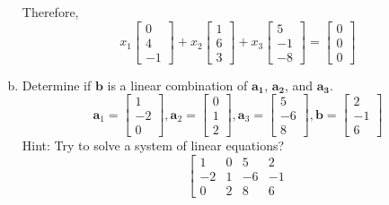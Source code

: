 \begin{enumerate}[(a)]
\begin{remark}
$$        $$
        \end{remark}
        Therefore,
        $$x_{1}\left[\begin{array}{r}
        0 \\
        4 \\
        -1
        \end{array}\right]+x_{2}\left[\begin{array}{l}
        1 \\
        6 \\
        3
        \end{array}\right]+x_{3}\left[\begin{array}{r}
        5 \\
        -1 \\
        -8
        \end{array}\right]=\left[\begin{array}{l}
        0 \\
        0 \\
        0
        \end{array}\right]$$
    \item Determine if $\mathbf{b}$ is a linear combination of $\mathbf{a_1}$, $\mathbf{a_2}$, and $\mathbf{a_3}$.
        $$\mathbf{a}_{1}=\left[\begin{array}{r}
        1 \\
        -2 \\
        0
        \end{array}\right], \mathbf{a}_{2}=\left[\begin{array}{l}
        0 \\
        1 \\
        2
        \end{array}\right], \mathbf{a}_{3}=\left[\begin{array}{r}
        5 \\
        -6 \\
        8
        \end{array}\right], \mathbf{b}=\left[\begin{array}{r}
        2 \\
        -1 \\
        6
        \end{array}\right]$$
        Hint: Try to solve a system of linear equations?
        $$
        \left[\begin{array}{ccc|c}
        1 & 0 & 5 & 2\\
        -2 & 1 & -6 & -1\\
        0 & 2 & 8 & 6

\end{array}$$
\end{enumerate}
